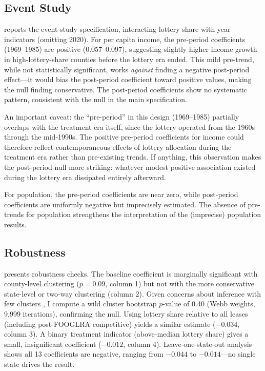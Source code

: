 \documentclass[12pt]{article}
\begin{document}


\subsection{Event Study}

 reports the event-study specification, interacting lottery share with year indicators (omitting 2020). For per capita income, the pre-period coefficients (1969--1985) are positive (0.057--0.097), suggesting slightly higher income growth in high-lottery-share counties before the lottery era ended. This mild pre-trend, while not statistically significant, works \textit{against} finding a negative post-period effect---it would bias the post-period coefficient toward positive values, making the null finding conservative. The post-period coefficients show no systematic pattern, consistent with the null in the main specification.

An important caveat: the ``pre-period'' in this design (1969--1985) partially overlaps with the treatment era itself, since the lottery operated from the 1960s through the mid-1990s. The positive pre-period coefficients for income could therefore reflect contemporaneous effects of lottery allocation during the treatment era rather than pre-existing trends. If anything, this observation makes the post-period null more striking: whatever modest positive association existed during the lottery era dissipated entirely afterward.

For population, the pre-period coefficients are near zero, while post-period coefficients are uniformly negative but imprecisely estimated. The absence of pre-trends for population strengthens the interpretation of the (imprecise) population results.



\subsection{Robustness}

 presents robustness checks. The baseline coefficient is marginally significant with county-level clustering ($p = 0.09$, column 1) but not with the more conservative state-level or two-way clustering (column 2). Given concerns about inference with few clusters \citep{cameron2008bootstrap}, I compute a wild cluster bootstrap $p$-value of 0.40 (Webb weights, 9,999 iterations), confirming the null. Using lottery share relative to all leases (including post-FOOGLRA competitive) yields a similar estimate ($-0.034$, column 3). A binary treatment indicator (above-median lottery share) gives a small, insignificant coefficient ($-0.012$, column 4). Leave-one-state-out analysis shows all 13 coefficients are negative, ranging from $-0.044$ to $-0.014$---no single state drives the result.
\end{document}

